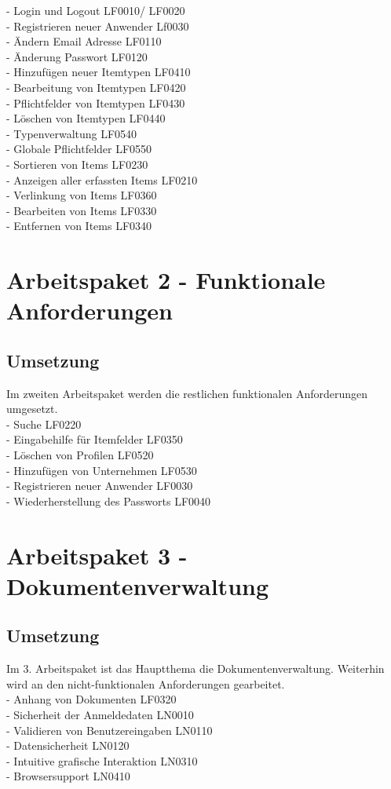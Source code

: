 \documentclass[11pt,a4paper]{report}
\begin{document}
- Login und Logout LF0010/ LF0020  \\
- Registrieren neuer Anwender Lf0030 \\
- Ändern Email Adresse LF0110 \\
- Änderung Passwort LF0120 \\
- Hinzufügen neuer Itemtypen LF0410\\
- Bearbeitung von Itemtypen LF0420\\
- Pflichtfelder von Itemtypen LF0430\\
- Löschen von Itemtypen LF0440\\
- Typenverwaltung LF0540\\
- Globale Pflichtfelder LF0550\\
- Sortieren von Items LF0230\\
- Anzeigen aller erfassten Items LF0210\\
- Verlinkung von Items LF0360\\
- Bearbeiten von Items LF0330\\
- Entfernen von Items LF0340\\

\section{Arbeitspaket 2 - Funktionale Anforderungen }
\subsection{Umsetzung}
Im zweiten Arbeitspaket werden die restlichen funktionalen Anforderungen umgesetzt.\\
- Suche LF0220\\
- Eingabehilfe für Itemfelder LF0350\\
- Löschen von Profilen LF0520\\
- Hinzufügen von Unternehmen LF0530\\
- Registrieren neuer Anwender LF0030\\
- Wiederherstellung des Passworts LF0040\\

\newpage

\section{Arbeitspaket 3 - Dokumentenverwaltung}
\subsection{Umsetzung}
Im 3. Arbeitspaket ist das Hauptthema die Dokumentenverwaltung. Weiterhin wird an den nicht-funktionalen Anforderungen gearbeitet. \\
- Anhang von Dokumenten LF0320\\
- Sicherheit der Anmeldedaten LN0010\\
- Validieren von Benutzereingaben LN0110\\
- Datensicherheit LN0120\\
- Intuitive grafische Interaktion LN0310\\
- Browsersupport LN0410\\
\end{document}
